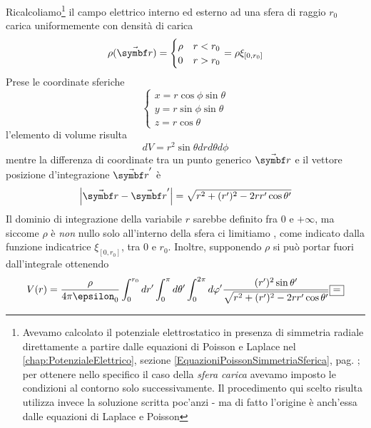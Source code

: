 \begin{examplewt}
	Ricalcoliamo\footnote{Avevamo calcolato il potenziale elettrostatico in presenza di simmetria radiale direttamente a partire dalle equazioni di Poisson e Laplace nel \autoref{chap:PotenzialeElettrico}, sezione \ref{EquazioniPoissonSimmetriaSferica}, pag. \pageref{EquazioniPoissonSimmetriaSferica}; per ottenere nello specifico il caso della \textit{sfera carica}  avevamo imposto le condizioni al contorno solo successivamente. Il procedimento qui scelto risulta utilizza invece la soluzione scritta poc'anzi - ma di fatto l'origine è anch'essa dalle equazioni di Laplace e Poisson} il campo elettrico interno ed esterno ad una sfera di raggio $r_0$ carica uniformemente con densità di carica
	\begin{equation*}
		\rho(\vba r)=
		\begin{cases}
			\rho & r<r_0\\
			0 & r>r_0
			\end{cases}=\rho\xi_{[0,r_0]}
	\end{equation*}
	Prese le coordinate sferiche
	\begin{equation*}
		\begin{cases}
			x=r\cos\phi\sin\theta\\
			y=r\sin\phi\sin\theta\\
			z=r\cos\theta
		\end{cases}
	\end{equation*}
	l'elemento di volume risulta
	\begin{equation*}
		dV=r^2\sin\theta drd\theta d\phi
	\end{equation*}
	mentre la differenza di coordinate tra un punto generico $\vba{r}$ e il vettore posizione d'integrazione  $\vba{r}'$ è
	\begin{equation*}
		\abs{\vba r-\vba r'}=\sqrt{r^2+(r')^2-2rr'\cos\theta '}
	\end{equation*}
	Il dominio di integrazione della variabile $r$ sarebbe definito fra $0$ e $+\infty$, ma siccome $\rho$ è \textit{non} nullo solo all'interno della sfera ci limitiamo , come indicato dalla funzione indicatrice $\xi_{[0,r_0]}$, tra $0$ e $r_0$. Inoltre, supponendo $\rho$ si può portar fuori dall'integrale ottenendo
	\begin{equation*}
		V(r)=\frac{\rho}{4\pi\epsilon_0}\int^{r_0}_0dr' \int^\pi_0 d\theta' \int^{2\pi}_0 d\phi' \frac{(r')^2 \sin\theta '}{\sqrt{r^2+(r')^2 -2rr'\cos\theta '}}\squarequal	
	\end{equation*}

\end{examplewt}
